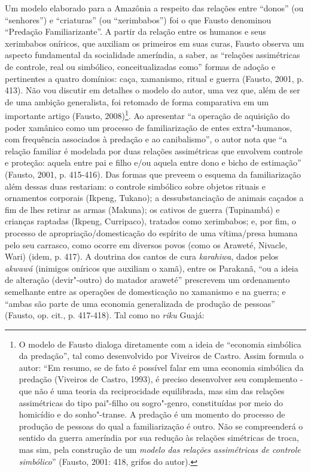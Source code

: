 Um modelo elaborado para a Amazônia a respeito das relações entre
``donos'' (ou ``senhores'') e ``criaturas'' (ou ``xerimbabos'') foi o que Fausto
denominou ``Predação Familiarizante''. A partir da relação entre os
humanos e seus xerimbabos oníricos, que auxiliam os primeiros em suas
curas, Fausto observa um aspecto fundamental da socialidade ameríndia, a
saber, as ``relações assimétricas de controle, real ou simbólico,
conceitualizadas como'' formas de adoção e pertinentes a quatro domínios:
caça, xamanismo, ritual e guerra (Fausto, 2001, p. 413). Não vou
discutir em detalhes o modelo do autor, uma vez que, além de ser de uma
ambição generalista, foi retomado de forma comparativa em um importante
artigo (Fausto, 2008)\footnote{O modelo de Fausto dialoga diretamente
  com a ideia de ``economia simbólica da predação'', tal como desenvolvido
  por Viveiros de Castro. Assim formula o autor: ``Em resumo, se de fato
      é possível falar em uma economia simbólica da predação (Viveiros de
      Castro, 1993), é preciso desenvolver seu complemento - que não é uma
      teoria da reciprocidade equilibrada, mas sim das relações assimétricas
      do tipo pai"-filho ou sogro"-genro, constituídas por meio do homicídio e
      do sonho"-transe. A predação é um momento do processo de produção de
      pessoas do qual a familiarização é outro. Não se compreenderá o
      sentido da guerra ameríndia por sua redução às relações simétricas de
      troca, mas sim, pela construção de um \emph{modelo das relações
      assimétricas de controle simbólico}'' (Fausto, 2001: 418, grifos do
  autor).}. Ao apresentar ``a operação de aquisição do poder xamânico
    como um processo de familiarização de entes extra"-humanos, com
    frequência associados à predação e ao canibalismo'', o autor nota que ``a
        relação familiar é modelada por duas relações assimétricas que envolvem
        controle e proteção: aquela entre pai e filho e/ou aquela entre dono e
        bicho de estimação'' (Fausto, 2001, p. 415-416). Das formas que preveem o
esquema da familiarização além dessas duas restariam: o controle
simbólico sobre objetos rituais e ornamentos corporais (Ikpeng, Tukano);
a dessubstanciação de animais caçados a fim de lhes retirar as armas
(Makuna); os cativos de guerra (Tupinambá) e crianças raptadas (Ikpeng,
Curripaco), tratados como xerimbabos; e, por fim, o processo de
apropriação/domesticação do espírito de uma vítima/presa humana pelo seu
carrasco, como ocorre em diversos povos (como os Araweté, Nivacle, Wari)
(idem, p. 417). A doutrina dos cantos de cura \emph{karahiwa}, dados
pelos \emph{akwawá} (inimigos oníricos que auxiliam o xamã), entre os
Parakanã, ``ou a ideia de alteração (devir"-outro) do matador araweté''
prescrevem um ordenamento semelhante entre as operações de domesticação
no xamanismo e na guerra; e ``ambas são parte de uma economia
generalizada de produção de pessoas'' (Fausto, op. cit., p. 417-418). Tal
como no \emph{riku} Guajá:

